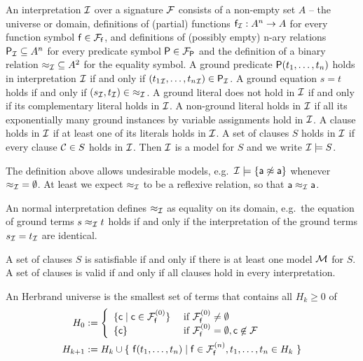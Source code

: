 \begin{definition}
	An {\myem interpretation} ${\mathcal I}$ over a signature ${\mathcal F}$ consists of a
	non-empty set $A$ -- the {\myem universe} or {\myem domain},
	definitions of (partial) functions ${\mathsf f}_{\mathcal I}: A^n\rightarrow A$ for every function symbol ${\mathsf f}\in{{\mathcal F}_{\mathsf f}}$, 
	and definitions of (possibly empty) n-ary relations 
	 ${{\mathsf P}_{\mathcal I}}\subseteq A^n$ for every predicate symbol ${\mathsf P}\in{{\mathcal F}_{\mathsf P}}$
	 and the definition of a binary relation ${\approx_{\mathcal I}}\subseteq A^2$ for the equality symbol.
%	
	A ground predicate ${\mathsf P}(t_1,\ldots,t_n)$ 
	{\myem holds} in interpretation ${\mathcal I}$ 
	if and only if $({t_1}_{\mathcal I},\ldots,{t_n}_{\mathcal I}) \in {\mathsf P}_{\mathcal I}$.
	A ground equation $s = t$ holds if and only if $(s_{\mathcal I},t_{\mathcal I}) \in {\approx_{\mathcal I}}$.
	A ground literal does not hold in ${\mathcal I}$ if and only if its complementary literal holds in ${\mathcal I}$.
%	
	A non-ground literal holds in ${\mathcal I}$ 
	if all its exponentially many ground instances by
	variable assignments hold in ${\mathcal I}$.
	A clause holds in ${\mathcal I}$ if at least one of its literals holds in ${\mathcal I}$.
	A set of clauses $S$ holds in ${\mathcal I}$ if every clause ${\mathcal C}\in S$ holds in ${\mathcal I}$.
	Then ${\mathcal I}$ is a model {\myem for} $S$ and
	we write ${\mathcal I}\models S$. 
\end{definition}

\begin{example}The definition above allows undesirable models, 
	e.g.~${\mathcal I}\models\{ {\mathsf a}\not\approx{\mathsf a} \}$ whenever ${\approx_{\mathcal I}} = \emptyset$.
	At least we expect $\approx_{\mathcal I}$ to be a reflexive relation, so that ${\mathsf a}\approx_{\mathcal I}{\mathsf a}$.
\end{example}

\begin{definition}
	An {\myem normal} interpretation defines $\approx_{\mathcal I}$ as equality on its domain,
	e.g.~the equation of ground terms $s \approx_{\mathcal I} t$ holds if and only 
	if the interpretation of the ground terms $s_{\mathcal I} = t_{\mathcal I}$ are identical.
\end{definition}

\begin{definition}
	A set of clauses $S$ is {\myem satisfiable} if and only if there is at least one model ${\mathcal M}$ for $S$. 
	A set of clauses is  {\myem valid} if and only if all clauses hold in every interpretation.
\end{definition}

\begin{definition}\label{def:hk}
	An {\myem Herbrand universe} is the smallest set of terms that contains all $H_k\ge 0$ of
	\begin{align*}
	H_0 &:= \left\{ 
	\begin{array}{ll}
	\{ \mc \mid \mc\in\mcFfn[0] \} 
	&\text{if } \mcFfn[0]\not=\emptyset\\
	\{ \mc \}
	&\text{if } \mcFfn[0]=\emptyset, \mc\not\in\mcF
	\end{array}
	\right. 
	\\
	H_{k+1} &:= H_k \cup \{\  
	\mf(t_1,\ldots,t_n) \mid
	\mf\in\mcFfn[n],
	t_1,\ldots,t_n \in H_k
	\ \}
	\end{align*}
	
\end{definition}

